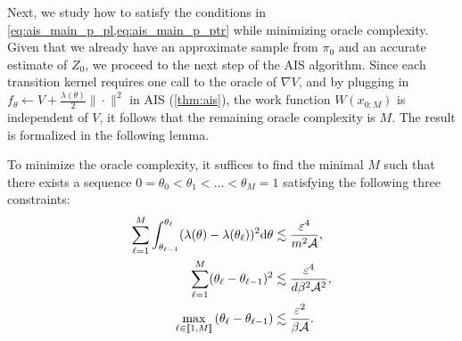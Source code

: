 Next, we study how to satisfy the conditions in \cref{eq:ais_main_p_pl,eq:ais_main_p_ptr} while minimizing oracle complexity. Given that we already have an approximate sample from $\pi_0$ and an accurate estimate of $Z_0$, we proceed to the next step of the AIS algorithm. Since each transition kernel requires one call to the oracle of $\nabla V$, and by plugging in $f_\theta\gets V+\frac{\lambda(\theta)}{2}\|\cdot\|^2$ in AIS (\cref{thm:ais}), the work function $W(x_{0:M})$ is independent of $V$, it follows that the remaining oracle complexity is $M$. The result is formalized in the following lemma.

\begin{lemma}
    To minimize the oracle complexity, it suffices to find the minimal $M$ such that there exists a sequence $0=\theta_0<\theta_1<...<\theta_M=1$ satisfying the following three constraints:
    \begin{align}
        \sum_{\ell=1}^M\int_{\theta_{\ell-1}}^{\theta_\ell}(\lambda(\theta)-\lambda(\theta_\ell))^2\mathrm{d}\theta & \lesssim\frac{\varepsilon^4}{m^2\mathcal{A}},\label{eq:ais_cond_theta_a}        \\
        \sum_{\ell=1}^{M}(\theta_\ell-\theta_{\ell-1})^2                                                                                                                                                                                                                      & \lesssim\frac{\varepsilon^4}{d\beta^2\mathcal{A}^2},\label{eq:ais_cond_theta_b} \\
        \max_{\ell\in\left[\!\left[1,M\right]\!\right]}\left(\theta_\ell-\theta_{\ell-1}\right)                                                                                                                                                                                                               & \lesssim\frac{\varepsilon^2}{\beta\mathcal{A}}.\label{eq:ais_cond_theta_c}
    \end{align}
\end{lemma}

